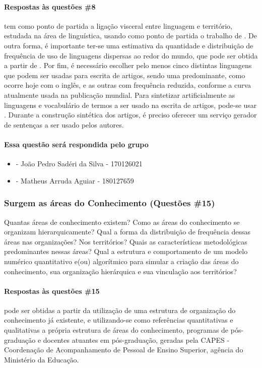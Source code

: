 \paragraph{Respostas às questões \#8} tem como ponto de partida a ligação visceral entre linguagem e território, estudada na área de linguística, usando como ponto de partida o trabalho de \cite{magadan_language_2020}.
De outra forma, é importante ter-se uma estimativa da quantidade e distribuição de frequência de uso de linguagens dispersas ao redor do mundo, que pode ser obtida a partir de \cite{infoplease_languages_2021}. 
Por fim, é necessário escolher pelo menos cinco distintas linguagens que podem ser usadas para escrita de artigos, sendo uma predominante, como ocorre hoje com o inglês, e as outras com frequência reduzida, conforme a curva atualmente usada na publicação mundial.
Para sintetizar artificialmente as linguagens e vocabulário de termos a ser usado na escrita de artigos, pode-se usar \cite{vulgarlang_fantasy_2021}.
Durante a construção sintética dos artigos, é preciso oferecer um serviço gerador de sentenças a ser usado pelos autores.

\paragraph{Essa questão será respondida pelo grupo}

\begin{itemize}
    \item - João Pedro Sadéri da Silva - 170126021
    \item - Matheus Arruda Aguiar - 180127659
\end{itemize}

\subsubsection{Surgem as áreas do Conhecimento (Questões \#15)} 
Quantas áreas de conhecimento existem? Como as áreas do conhecimento se organizam hierarquicamente? Qual a forma da distribuição de frequência dessas áreas nas organizações? Nos territórios? Quais as características metodológicas predominantes nessas áreas? Qual a estrutura e comportamento de um modelo numérico quantitativo e(ou) algorítmico para simular a criação das áreas do conhecimento, sua organização hierárquica e sua vinculação aos territórios? 


\paragraph{Respostas às questões \#15} pode ser obtidas a partir da utilização de uma estrutura de organização do conhecimento já existente, e utilizando-se como referências quantitativas e qualitativas a própria estrutura de áreas do conhecimento, programas de pós-graduação e docentes atuantes em pós-graduação, geradas pela CAPES - Coordenação de Acompanhamento de Pessoal de Ensino Superior, agência do Ministério da Educação. 

